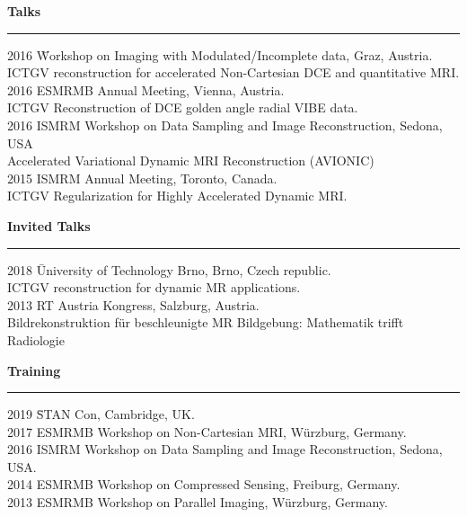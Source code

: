 \vspace{0.7cm}
{\bf Talks}\\
\noindent\rule{\textwidth}{0.5pt}
\begin{tabbing}
    2016 \=  Workshop on Imaging with Modulated/Incomplete data, Graz, Austria. \\ 
	 \> ICTGV reconstruction for accelerated Non-Cartesian DCE and quantitative MRI. \\
    2016 \> ESMRMB Annual Meeting, Vienna, Austria. \\
	 \> ICTGV Reconstruction of DCE golden angle radial VIBE data. \\
    2016 \> ISMRM Workshop on Data Sampling and Image Reconstruction, Sedona, USA \\
	 \> Accelerated Variational Dynamic MRI Reconstruction (AVIONIC) \\  
    2015 \> ISMRM Annual Meeting, Toronto, Canada. \\
	 \> ICTGV Regularization for Highly Accelerated Dynamic MRI.  
\end{tabbing}
\bigskip

\newpage
\vspace{0.7cm}
{\bf Invited Talks}\\
\noindent\rule{\textwidth}{0.5pt}
\begin{tabbing}
     2018 \= University of Technology Brno, Brno, Czech republic.\\
	  \> ICTGV reconstruction for dynamic MR applications. \\
    2013 \>  RT Austria Kongress, Salzburg, Austria. \\
	 \> Bildrekonstruktion f\"ur beschleunigte MR Bildgebung: Mathematik trifft Radiologie
\end{tabbing}
\bigskip


\vspace{0.7cm}
{\bf Training}\\
\noindent\rule{\textwidth}{0.5pt}
\begin{tabbing}
2019 \= STAN Con, Cambridge, UK. \\
2017 \> ESMRMB Workshop on Non-Cartesian MRI, W\"urzburg, Germany. \\
2016 \> ISMRM Workshop on Data Sampling and Image Reconstruction, Sedona, USA.\\
2014 \> ESMRMB Workshop on Compressed Sensing, Freiburg, Germany.\\
2013 \> ESMRMB Workshop on Parallel Imaging, W\"urzburg, Germany.
\end{tabbing}
\bigskip

